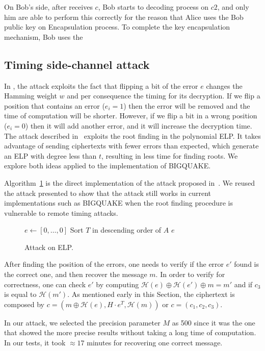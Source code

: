 On Bob's side, after receives $c$, Bob starts to decoding process on $c2$, and only him are able to perform this correctly for the reason that Alice uses the Bob public key on Encapsulation process. To complete the key encapsulation mechanism, Bob uses the 

\subsection{Timing side-channel attack}
In \cite{shoufan2009timing}, the attack exploits the fact that flipping a bit of the error $e$ changes the Hamming weight $w$ and per consequence the timing for its decryption. If we flip a position that contains an error ($e_i = 1$) then the error will be removed and the time of computation will be shorter. However, if we flip a bit in a wrong position ($e_i = 0$) then it will add another error, and it will increase the decryption time. The attack described in~\cite{bucerzan2017improved} exploits the root finding in the polynomial ELP. It takes advantage of sending ciphertexts with fewer errors than expected, which generate an ELP with degree less than $t$, resulting in less time for finding roots. We explore both ideas applied to the implementation of BIGQUAKE.

Algorithm~\ref{alg:attack:1} is the direct implementation of the attack proposed in~\cite{shoufan2009timing}. We reused the attack presented to show that the attack still works in current implementations such as BIGQUAKE when the root finding procedure is vulnerable to remote timing attacks.

\begin{figure}
\centering
\begin{algorithm}[H]
 $e \gets [0,\ldots,0]$\;
Sort $T$ in descending order of $A$\;
\Return $e$\;
 \caption{Attack on ELP.}
  \label{alg:attack:1}
\end{algorithm}
\end{figure}

After finding the position of the errors, one needs to verify if the error $e'$ found is the correct one, and then recover the message $m$. In order to verify for correctness, one can check $e'$ by computing $\mathcal{H}(e) \oplus \mathcal{H}(e') \oplus m = m'$ and if $c_3$ is equal to $\mathcal{H}(m')$. As mentioned early in this Section, the ciphertext is composed by $c = (m\oplus\mathcal{H}(e), H\cdot e^T, \mathcal{H}(m))$ or $c = (c_1, c_2, c_3)$.

In our attack, we selected the precision parameter $M$ as 500 since it was the one that showed the more precise results without taking a long time of computation.  In our tests, it took $\approx17$ minutes for recovering one correct message.